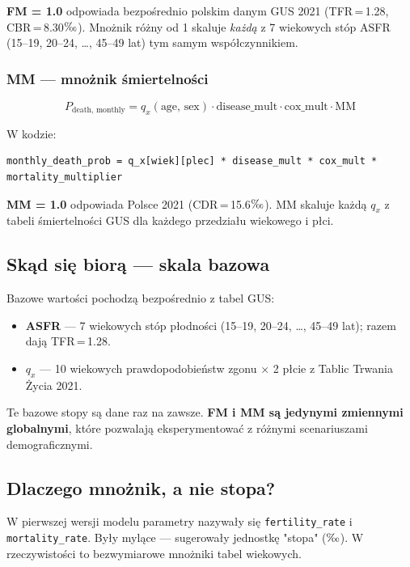 \documentclass[11pt,a4paper]{article}
\newcommand{\promile}{\ensuremath{\text{\textperthousand}}}
\begin{document}
\textbf{FM = 1.0} odpowiada bezpośrednio polskim danym GUS 2021 (TFR\,=\,1.28, CBR\,=\,8.30\promile). Mnożnik różny od 1 skaluje \emph{każdą} z 7 wiekowych stóp ASFR (15--19, 20--24, \ldots, 45--49 lat) tym samym współczynnikiem.

\subsubsection{MM --- mnożnik śmiertelności}

\begin{formulabox}
\[
P_{\text{death, monthly}} = q_x(\text{age, sex}) \cdot \text{disease\_mult} \cdot \text{cox\_mult} \cdot \text{MM}
\]
\end{formulabox}

W kodzie:
\begin{lstlisting}
monthly_death_prob = q_x[wiek][plec] * disease_mult * cox_mult * mortality_multiplier
\end{lstlisting}

\textbf{MM = 1.0} odpowiada Polsce 2021 (CDR\,=\,15.6\promile). MM skaluje każdą $q_x$ z tabeli śmiertelności GUS dla każdego przedziału wiekowego i płci.

\subsection{Skąd się biorą --- skala bazowa}

Bazowe wartości pochodzą bezpośrednio z tabel GUS:

\begin{itemize}[leftmargin=*]
  \item \textbf{ASFR} --- 7 wiekowych stóp płodności (15--19, 20--24, \ldots, 45--49 lat); razem dają TFR\,=\,1.28.
  \item \textbf{$q_x$} --- 10 wiekowych prawdopodobieństw zgonu × 2 płcie z Tablic Trwania Życia 2021.
\end{itemize}

Te bazowe stopy są dane raz na zawsze. \textbf{FM i MM są jedynymi zmiennymi globalnymi}, które pozwalają eksperymentować z różnymi scenariuszami demograficznymi.

\subsection{Dlaczego mnożnik, a nie stopa?}

W pierwszej wersji modelu parametry nazywały się \texttt{fertility\_rate} i \texttt{mortality\_rate}. Były mylące --- sugerowały jednostkę "stopa" (\promile{}). W rzeczywistości to bezwymiarowe mnożniki tabel wiekowych.
\end{document}
